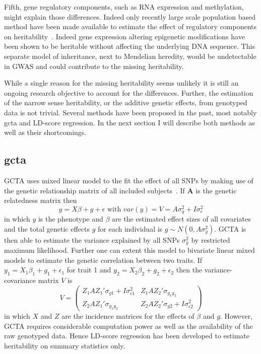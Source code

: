 \documentclass[../header.tex]{subfiles}
\begin{document}
Fifth, gene regulatory components, such as RNA expression and methylation, might explain those differences.
Indeed only recently large scale population based method have been made available to estimate the effect of regulatory components on heritability~\cite{Trerotola2015}.
Indeed gene expression altering epigenetic modifications have been shown to be heritable without affecting the underlying DNA sequence.
This separate model of inheritance, next to Mendelian heredity, would be undetectable in GWAS and could contribute to the missing heritability.

While a single reason for the missing heritability seems unlikely it is still an ongoing research objective to account for the differences.
Further, the estimation of the narrow sense heritability, or the additive genetic effects, from genotyped data is not trivial.
Several methods have been proposed in the past, most notably \acrfull{gcta} and LD-score regression.
In the next section I will describe both methods as well as their shortcomings.

\subsection{\acrfull{gcta}}
\label{sub:gcta}

GCTA uses mixed linear model to the fit the effect of all SNPs by making use of the genetic relationship matrix of all included subjects~\cite{Yang2011}.
If $\textbf{A}$ is the genetic relatedness matrix then
\begin{equation}
  y = X\beta + g + \epsilon \text{ with } var(y) = V = A\sigma^2_g + I\sigma^2_\epsilon
\end{equation}
in which $y$ is the phenotype and $\beta$ are the estimated effect sizes of all covariates and the total genetic effects $g$ for each individual is $g \sim N(0, A\sigma^2_g)$.
GCTA is then able to estimate the variance explained by all SNPs $\sigma^2_g$ by restricted maximum likelihood.
Further one can extent this model to bivariate linear mixed models to estimate the genetic correlation between two traits.
If $y_1 = X_1\beta_1 + g_1 + \epsilon_1$ for trait 1 and $y_2= X_2\beta_2 + g_2 + \epsilon_2$ then the variance-covariance matrix $V$ is
\begin{equation}
  V = 
  \begin{pmatrix}
    Z_1AZ_1'\sigma_{g1} + I\sigma^2_{\epsilon 1} & Z_1AZ_2'\sigma_{g_1g_2} \\
    Z_2AZ_1'\sigma_{g_1g_2} & Z_2AZ_2'\sigma_{g2} + I\sigma^2_{\epsilon 2}
  \end{pmatrix}
\end{equation}
in which $X$ and $Z$ are the incidence matrices for the effects of $\beta$ and $g$.
However, GCTA requires considerable computation power as well as the availability of the raw genotyped data.
Hence LD-score regression has been developed to estimate heritability on summary statistics only.
\end{document}
